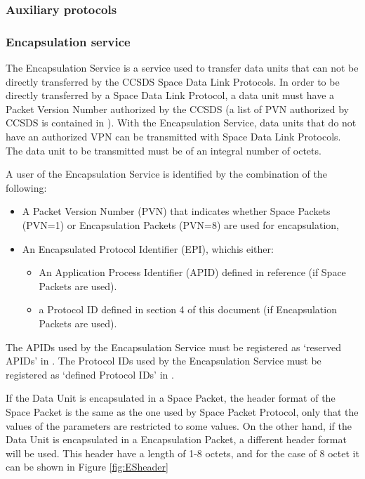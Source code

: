\subsubsection{Auxiliary protocols}

\subsubsection*{Encapsulation service\cite{ES}}
The Encapsulation Service is a service used to transfer data units that can not be directly transferred by the CCSDS Space Data Link Protocols. In order to be directly transferred by a Space Data Link Protocol, a data unit must have a Packet Version Number authorized by the CCSDS (a list of PVN authorized by CCSDS is contained in \cite{SANAPVN}). With the Encapsulation Service, data units that do not have an authorized VPN can be transmitted with Space Data Link Protocols. The data unit to be transmitted must be of an integral number of octets.

A user of the Encapsulation Service is identified by the combination of the following:

\begin{itemize}
\item A Packet Version Number (PVN) that indicates whether Space Packets (PVN=1) or Encapsulation Packets (PVN=8) are used for encapsulation,
\item An Encapsulated Protocol Identifier (EPI), whichis either:
\begin{itemize}
\item An Application Process Identifier (APID) defined in reference (if Space Packets are used).
\item a Protocol ID defined in section 4 of this document (if Encapsulation Packets are used).
\end{itemize}
\end{itemize}

The APIDs used by the Encapsulation Service must be registered as ‘reserved APIDs’ in \cite{SANAAPID}. The Protocol IDs used by the Encapsulation Service must be registered as ‘defined Protocol IDs’ in \cite{SANAPID}.

If the Data Unit is encapsulated in a Space Packet, the header format of the Space Packet is the same as the one used by Space Packet Protocol, only that the values of the parameters are restricted to some values. On the other hand, if the Data Unit is encapsulated in a Encapsulation Packet, a different header format will be used. This header have a length of 1-8 octets, and for the case of 8 octet it can be shown in Figure \ref{fig:ESheader}

